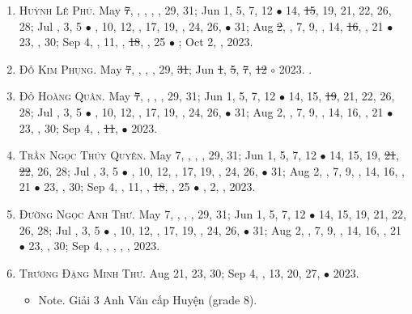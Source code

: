 \documentclass{article}
\begin{document}
\begin{enumerate}
	\item \textsc{Huỳnh Lê Phú.} May \st{7}, , , , , 29, 31; Jun 1, 5, 7, 12 $\bullet$ 14, \st{15}, 19, 21, 22, 26, 28; Jul , 3, 5 $\bullet$ , 10, 12, , 17, 19, , 24, 26,  $\bullet$ 31; Aug \st{2}, , 7, 9, , 14, \st{16}, , 21 $\bullet$ 23, , 30; Sep 4, , 11, , \st{18}, , 25 $\bullet$ ; Oct 2, , 2023.
	\item \textsc{Đỗ Kim Phụng.} May \st{7}, , , , 29, \st{31}; Jun \st{1}, \st{5}, \st{7}, \st{12} $\circ$ 2023. {}. {\sf[Out]}
	\item \textsc{Đỗ Hoàng Quân.} May \st{7}, , , , 29, 31; Jun 1, 5, 7, 12 $\bullet$ 14, 15, \st{19}, 21, 22, 26, 28; Jul , 3, 5 $\bullet$ , 10, 12, , 17, 19, , 24, 26,  $\bullet$ 31; Aug 2, , 7, 9, , 14, 16, , 21 $\bullet$ 23, , 30; Sep 4, , \st{11},  $\bullet$ 2023. {\sf[Out]}
	\item \textsc{Trần Ngọc Thúy Quyên.} May 7, , , , 29, 31; Jun 1, 5, 7, 12 $\bullet$ 14, 15, 19, \st{21}, \st{22}, 26, 28; Jul , 3, 5 $\bullet$ , 10, 12, , 17, 19, , 24, 26,  $\bullet$ 31; Aug 2, , 7, 9, , 14, 16, , 21 $\bullet$ 23, , 30; Sep 4, , 11, , \st{18}, , 25 $\bullet$ , 2, , 2023.
	\item \textsc{Đường Ngọc Anh Thư.} May 7, , , , 29, 31; Jun 1, 5, 7, 12 $\bullet$ 14, 15, 19, 21, 22, 26, 28; Jul , 3, 5 $\bullet$ , 10, 12, , 17, 19, , 24, 26,  $\bullet$ 31; Aug 2, , 7, 9, , 14, 16, , 21 $\bullet$ 23, , 30; Sep 4, , , , , 2023.
	\item \textsc{Trương Đặng Minh Thư.} Aug 21, 23, 30; Sep 4, , 13, 20, 27, $\bullet$ 2023.
	\begin{itemize}
		\item {\sf Note.} Giải 3 Anh Văn cấp Huyện (grade 8).
	\end{itemize}
\end{enumerate}

\end{document}
